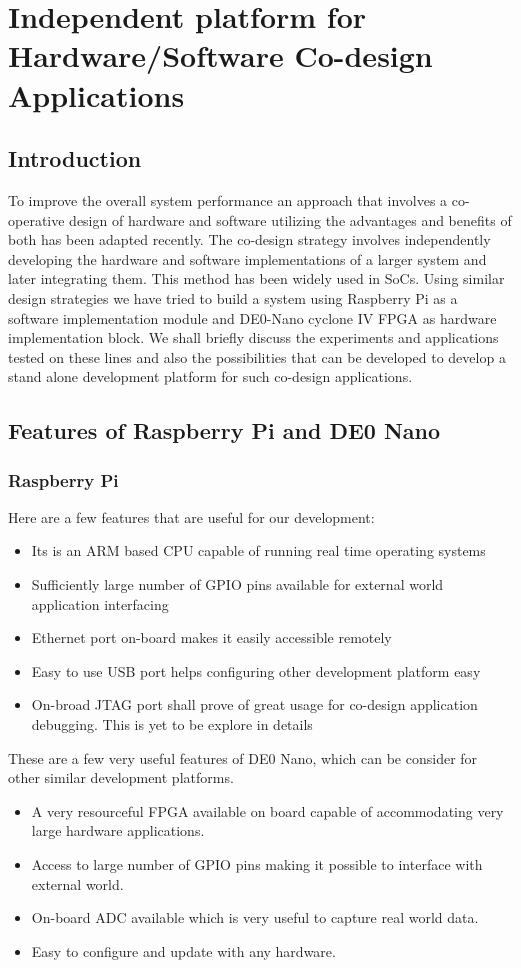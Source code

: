 \chapter{Independent platform for Hardware/Software Co-design Applications}
\label{chapter8}

\section{Introduction}
To improve the overall system performance an approach that involves a co-operative design of hardware and software utilizing the advantages and benefits of both has been adapted recently. The co-design strategy involves independently developing the hardware and software implementations \cite{DesignReuse} of a larger system and later integrating them. This method has been widely used in SoCs. Using similar design strategies we have tried to build a system using Raspberry Pi as a software implementation module and DE0-Nano cyclone IV FPGA as hardware implementation block. We shall briefly discuss the experiments and applications tested on these lines and also the possibilities that can be developed to develop a stand alone development platform for such co-design applications.

\section{Features of Raspberry Pi and DE0 Nano}
\subsection{Raspberry Pi}
Here are a few features \cite{RPiManual} that are useful for our development:
\begin{itemize}
	\item{Its is an ARM based CPU capable of running real time operating systems}
	\item{Sufficiently large number of GPIO pins available for external world application interfacing}
	\item{Ethernet port on-board makes it easily accessible remotely}
	\item{Easy to use USB port helps configuring other development platform easy}
	\item{On-broad JTAG port shall prove of great usage for co-design application debugging. This is yet to be explore in details}
\end{itemize}

These are a few very useful features of DE0 Nano, which can be consider for other similar development platforms.
\begin{itemize}
	\item{A very resourceful FPGA available on board capable of accommodating very large hardware applications.}
	\item{Access to large number of GPIO pins making it possible to interface with external world.}
	\item{On-board ADC available which is very useful to capture real world data.}
	\item{Easy to configure and update with any hardware.}
\end{itemize}

